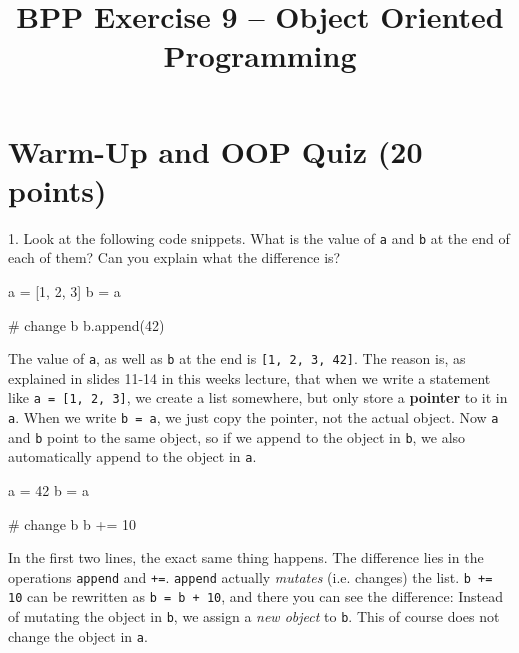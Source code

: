 

\title{BPP Exercise 9 -- Object Oriented Programming}







\section{Warm-Up and OOP Quiz (20 points)}


1. Look at the following code snippets. What is the value of {\tt a} and {\tt b} at the end of each of them? Can you explain what the difference is?

\begin{pythoncode}
a = [1, 2, 3]
b = a

# change b
b.append(42)
\end{pythoncode}

\begin{solution}
    The value of {\tt a}, as well as {\tt b} at the end is {\tt [1, 2, 3, 42]}. The reason is, as explained in slides 11-14 in this weeks lecture, that when we write a statement like {\tt a = [1, 2, 3]}, we create a list somewhere, but only store a {\bf pointer} to it in {\tt a}. When we write {\tt b = a}, we just copy the pointer, not the actual object. Now {\tt a} and {\tt b} point to the same object, so if we append to the object in {\tt b}, we also automatically append to the object in {\tt a}.
\end{solution}

\begin{pythoncode}
a = 42
b = a

# change b
b += 10
\end{pythoncode}

\begin{solution}
    In the first two lines, the exact same thing happens. The difference lies in the operations {\tt append} and {\tt +=}. {\tt append} actually {\it mutates} (i.e. changes) the list. {\tt b += 10} can be rewritten as {\tt b = b + 10}, and there you can see the difference: Instead of mutating the object in {\tt b}, we assign a {\it new object} to {\tt b}. This of course does not change the object in {\tt a}.

    \vspace{1em}
\end{solution}

